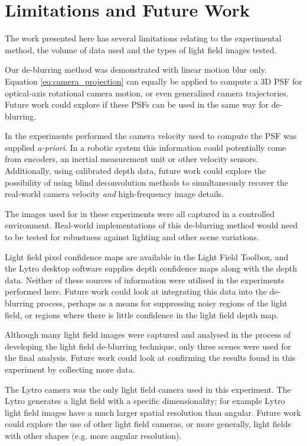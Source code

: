\section{Limitations and Future Work}
\label{sec:limitations_and_future_work}

The work presented here has several limitations relating to the experimental method, the volume of data used and the types of light field images tested.

Our de-blurring method was demonstrated with linear motion blur only.
Equation \ref{eq:camera_projection} can equally be applied to compute a 3D PSF for optical-axis rotational camera motion, or even generalized camera trajectories.
Future work could explore if these PSFs can be used in the same way for de-blurring.

In the experiments performed the camera velocity used to compute the PSF was supplied \emph{a-priori}.
In a robotic system this information could potentially come from encoders, an inertial measurement unit or other velocity sensors.
Additionally, using calibrated depth data, future work could explore the possibility of using blind deconvolution methods to simultaneously recover the real-world camera velocity \emph{and} high-frequency image details.

The images used for in these experiments were all captured in a controlled environment.
Real-world implementations of this de-blurring method would need to be tested for robustness against lighting and other scene variations.

Light field pixel confidence maps are available in the Light Field Toolbox, and the Lytro desktop software supplies depth confidence maps along with the depth data.
Neither of these sources of information were utilised in the experiments performed here.
Future work could look at integrating this data into the de-blurring process, perhaps as a means for suppressing noisy regions of the light field, or regions where there is little confidence in the light field depth map.

Although many light field images were captured and analysed in the process of developing the light field de-blurring technique, only three scenes were used for the final analysis.
Future work could look at confirming the results found in this experiment by collecting more data.

The Lytro camera was the only light field camera used in this experiment.
The Lytro generates a light field with a specific dimensionality; for example Lytro light field images have a much larger spatial resolution than angular.
Future work could explore the use of other light field cameras, or more generally, light fields with other shapes (e.g. more angular resolution).

